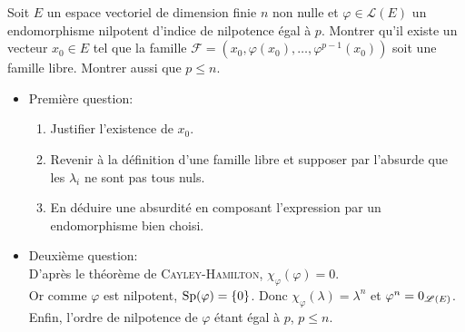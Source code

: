 Soit $E$ un espace vectoriel de dimension finie $n$ non nulle et $\varphi \in \mathscr{L}(E)$ un endomorphisme nilpotent d'indice de nilpotence égal à $p$. Montrer qu'il existe un vecteur $x_0 \in E$ tel que la famille $\mathscr{F}=(x_0, \varphi(x_0), \dots, \varphi^{p-1}(x_0))$ soit une famille libre. Montrer aussi que $p \leqslant n$. 

\begin{itemize}
    \item Première question:
    \begin{enumerate}
        \item Justifier l'existence de $x_0$.
        \item Revenir à la définition d'une famille libre et supposer par l'absurde que les $\lambda_i$ ne sont pas tous nuls. 
        \item En déduire une absurdité en composant l'expression par un endomorphisme bien choisi.
    \end{enumerate}
    \item Deuxième question:\\
        D'après le théorème de \textsc{Cayley}-\textsc{Hamilton}, $\chi_{\varphi}(\varphi) = 0$. \\
        Or comme $\varphi$ est nilpotent, $\mathrm{Sp}(\varphi) = \{0\}$. Donc $\chi_{\varphi}(\lambda) = \lambda^n$ et $\varphi^n = 0_{\mathscr{L}(E)}$. Enfin, l'ordre de nilpotence de $\varphi$ étant égal à $p$, $p \leqslant n$. 
\end{itemize}
